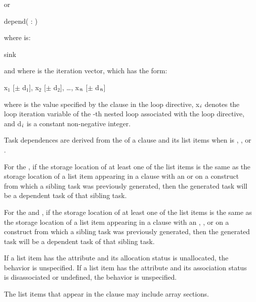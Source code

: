 or

\begin{boxedcode}
depend( : )
\end{boxedcode}

where  is:
\begin{indentedcodelist}
sink
\end{indentedcodelist}

and where  is the iteration vector, which has the form:

x$_{1}$ [$\pm $ d$_{1}$], x$_{2}$ [$\pm $ d$_{2}$], \ldots, x$_{{\textrm{\textmd{\itshape{n}}}}}$ [$\pm $ d$_{{\textrm{\textmd{\itshape{n}}}}}$]

where  is the value specified by the  clause in the loop
directive, x$_{{\textrm{\textmd{\itshape{i}}}}}$ denotes the loop iteration variable of the -th
nested loop associated with the loop directive, and d$_{{\textrm{\textmd{\itshape{i}}}}}$ is a
constant non-negative integer.

\descr
Task dependences are derived from the  of a  clause and its list 
items when  is , , or .

For the  , if the storage location of at least one
of the list items is the same as the storage location of a list item appearing
in a  clause with an  or   on a construct
from which a sibling task was previously generated, then the generated task
will be a dependent task of that sibling task.

For the  and  , if the storage location of at least one
of the list items is the same as the storage location of a list item appearing
in a  clause with an , , or   on
a construct from which a sibling task was previously generated, then the
generated task will be a dependent task of that sibling task.

\begin{fortranspecific}
If a list item has the  attribute and its allocation
status is unallocated, the behavior is unspecified. If a list item has
the  attribute and its association status is
disassociated or undefined, the behavior is unspecified.
\end{fortranspecific}

The list items that appear in the  clause may include array sections.


